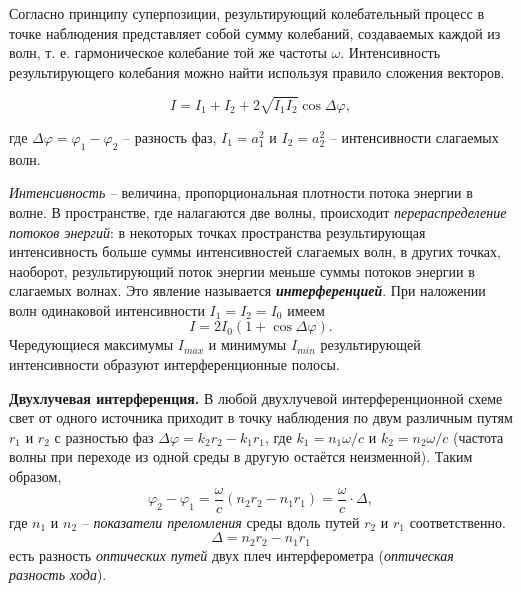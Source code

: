 \documentclass[a4paper,12pt]{article}
\begin{document}
Согласно принципу суперпозиции, результирующий колебательный процесс в точке наблюдения представляет собой сумму колебаний, создаваемых каждой из волн, т. е. гармоническое колебание той же частоты $\omega$.  Интенсивность результирующего колебания можно найти используя правило сложения векторов.

\begin{equation}\label{eq: Сложение колебаний}
    I = I_1 + I_2 + 2\sqrt{I_1 I_2}\cos{\Delta \varphi},
\end{equation}

где $\Delta\varphi = \varphi_1 - \varphi_2$ -- разность фаз, $I_1 = a_1^2$ и $I_2 = a_2^2$ -- интенсивности слагаемых волн.

\textit{Интенсивность} -- величина, пропорциональная плотности потока энергии в волне. В пространстве, где налагаются две волны, происходит \textit{перераспределение потоков энергий}: в некоторых точках пространства результирующая интенсивность больше суммы интенсивностей слагаемых волн, в других точках, наоборот, результирующий поток энергии меньше суммы потоков энергии в слагаемых волнах. Это явление называется \textbf{\textit{интерференцией}}. При наложении волн одинаковой интенсивности $I_1 = I_2 = I_0$ имеем 
\begin{equation}\label{eq: Сложение колебаний I_1 = I_2}
    I = 2 I_0(1 + \cos{\Delta \varphi}).
\end{equation}
Чередующиеся максимумы $I_{max}$ и минимумы $I_{min}$ результирующей интенсивности образуют интерференционные полосы.

\textbf{Двухлучевая интерференция.}  
В любой двухлучевой интерференционной схеме свет от одного источника приходит в точку наблюдения по двум различным путям $r_1$ и $r_2$ с разностью фаз $\Delta\varphi = k_2r_2 - k_1r_1$, где $k_1 = n_1 \omega / c$ и $k_2 = n_2 \omega / c$ (частота волны при переходе из одной среды в другую остаётся неизменной). Таким образом,
\begin{equation}\label{eq: Разность фаз двухлучевой интерференции}
    \varphi_2 - \varphi_1 = \frac{\omega}{c}(n_2r_2 - n_1r_1) = \frac{\omega}{c} \cdot \Delta,   
\end{equation}
где $n_1$ и $n_2$ -- \textit{показатели преломления} среды вдоль путей $r_2$ и $r_1$ соответственно. 
\begin{equation}\label{eq: Разность оптических путей}
    \Delta = n_2r_2 - n_1r_1
\end{equation}
есть разность \textit{оптических путей} двух плеч интерферометра (\textit{оптическая разность хода}). 
\end{document}
